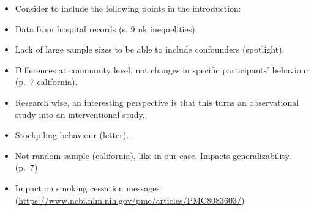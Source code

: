\documentclass[
  11pt,
]{article}
\providecommand{\tightlist}{%
  \setlength{\itemsep}{0pt}\setlength{\parskip}{0pt}}
\begin{document}
\begin{itemize}
\tightlist
\item
  Consider to include the following points in the introduction:
\item
  Data from hospital records (s. 9 uk inequelities)
\item
  Lack of large sample sizes to be able to include confounders
  (spotlight).
\item
  Differences at community level, not changes in specific participants'
  behaviour (p.~7 california).
\item
  Research wise, an interesting perspective is that this turns an
  observational study into an interventional study.
\item
  Stockpiling behaviour (letter).
\item
  Not random sample (california), like in our case. Impacts
  generalizability. (p.~7)
\item
  Impact on smoking cessation messages
  (\url{https://www.ncbi.nlm.nih.gov/pmc/articles/PMC8083603/})
\end{itemize}
\end{document}
